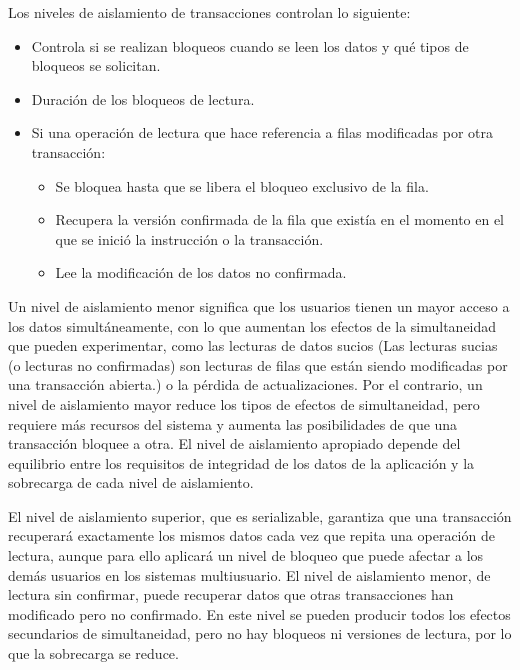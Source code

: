\documentclass[spanish]{article}
\begin{document}
Los niveles de aislamiento de transacciones controlan lo siguiente:
\begin{itemize}
    \item Controla si se realizan bloqueos cuando se leen los datos y qué tipos de bloqueos se solicitan.
    \newpage
    \item Duración de los bloqueos de lectura.
    \item Si una operación de lectura que hace referencia a filas modificadas por otra transacción:
        \begin{itemize}
            \item Se bloquea hasta que se libera el bloqueo exclusivo de la fila.
            \item Recupera la versión confirmada de la fila que existía en el momento en el que se inició la instrucción o la transacción.
            \item Lee la modificación de los datos no confirmada.
        \end{itemize}

\end{itemize}



Un nivel de aislamiento menor significa que los usuarios tienen un mayor acceso a los datos simultáneamente, con lo que aumentan los efectos de la simultaneidad que pueden experimentar, como las lecturas de datos sucios
(Las lecturas sucias (o lecturas no confirmadas) son lecturas de filas que están siendo modificadas por una transacción abierta.) o la pérdida de actualizaciones. Por el contrario, un nivel de aislamiento mayor reduce los tipos de efectos de simultaneidad, pero requiere más recursos del sistema y aumenta las posibilidades de que una transacción bloquee a otra. El nivel de aislamiento apropiado depende del equilibrio entre los requisitos de integridad de los datos de la aplicación y la sobrecarga de cada nivel de aislamiento.

 El nivel de aislamiento superior, que es serializable, garantiza que una transacción recuperará exactamente los mismos datos cada vez que repita una operación de lectura, aunque para ello aplicará un nivel de bloqueo que puede afectar a los demás usuarios en los sistemas multiusuario. El nivel de aislamiento menor, de lectura sin confirmar, puede recuperar datos que otras transacciones han modificado pero no confirmado. En este nivel se pueden producir todos los efectos secundarios de simultaneidad, pero no hay bloqueos ni versiones de lectura, por lo que la sobrecarga se reduce.
 
\end{document}
